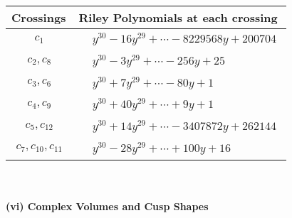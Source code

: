 \documentclass[1p]{elsarticle_modified}
\theoremstyle{definition}
\begin{document}
\begin{tabular}{m{50pt}|m{274pt}}
Crossings & \hspace{64pt}Riley Polynomials at each crossing \\
\hline $$\begin{aligned}c_{1}\end{aligned}$$&$\begin{aligned}
&y^{30}-16 y^{29}+\cdots-8229568 y+200704
\end{aligned}$\\
\hline $$\begin{aligned}c_{2},c_{8}\end{aligned}$$&$\begin{aligned}
&y^{30}-3 y^{29}+\cdots-256 y+25
\end{aligned}$\\
\hline $$\begin{aligned}c_{3},c_{6}\end{aligned}$$&$\begin{aligned}
&y^{30}+7 y^{29}+\cdots-80 y+1
\end{aligned}$\\
\hline $$\begin{aligned}c_{4},c_{9}\end{aligned}$$&$\begin{aligned}
&y^{30}+40 y^{29}+\cdots+9 y+1
\end{aligned}$\\
\hline $$\begin{aligned}c_{5},c_{12}\end{aligned}$$&$\begin{aligned}
&y^{30}+14 y^{29}+\cdots-3407872 y+262144
\end{aligned}$\\
\hline $$\begin{aligned}c_{7},c_{10},c_{11}\end{aligned}$$&$\begin{aligned}
&y^{30}-28 y^{29}+\cdots+100 y+16
\end{aligned}$\\
\hline
\end{tabular}\\~\\
\newpage\flushleft \textbf{(vi) Complex Volumes and Cusp Shapes}
\end{document}
